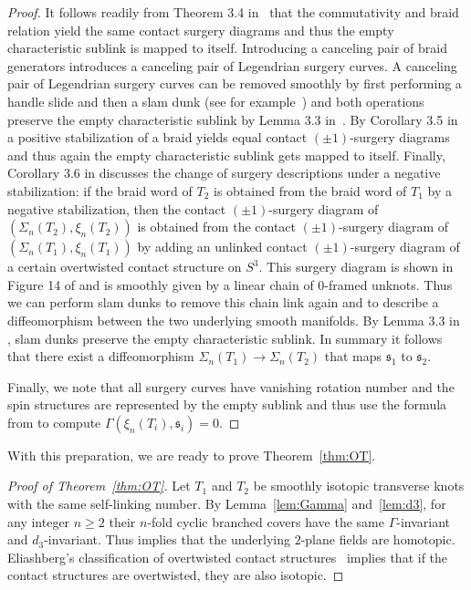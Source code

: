 \documentclass[11pt]{amsart}
\theoremstyle{definition}
\theoremstyle{definition}
\theoremstyle{definition}
\theoremstyle{definition}
\begin{document}
\begin{proof}
    It follows readily from Theorem 3.4 in~\cite{Harvey_br_covers} that the commutativity and braid relation yield the same contact surgery diagrams and thus the empty characteristic sublink is mapped to itself. Introducing a canceling pair of braid generators introduces a canceling pair of Legendrian surgery curves. A canceling pair of Legendrian surgery curves can be removed smoothly by first performing a handle slide and then a slam dunk (see for example~\cite{Casals_Etnyre_Kegel,surgery_distance}) and both operations preserve the empty characteristic sublink by Lemma 3.3 in~\cite{surgery_distance}. By Corollary 3.5 in \cite{Harvey_br_covers} a positive stabilization of a braid yields equal contact $(\pm1)$-surgery diagrams and thus again the empty characteristic sublink gets mapped to itself. Finally, Corollary 3.6 in \cite{Harvey_br_covers} discusses the change of surgery descriptions under a negative stabilization: if the braid word of $T_2$ is obtained from the braid word of $T_1$ by a negative stabilization, then the contact $(\pm1)$-surgery diagram of $(\Sigma_n(T_2),\xi_n(T_2))$ is obtained from the contact $(\pm1)$-surgery diagram of $(\Sigma_n(T_1),\xi_n(T_1))$ by adding an unlinked contact $(\pm1)$-surgery 
    diagram of a certain overtwisted contact structure on $S^3$. This surgery diagram is shown in Figure 14 of \cite{Harvey_br_covers} and is smoothly given by a linear chain of $0$-framed unknots. Thus we can perform slam dunks to remove this chain link again and to describe a diffeomorphism between the two underlying smooth manifolds. By Lemma 3.3 in \cite{surgery_distance}, slam dunks preserve the empty characteristic sublink. In summary it follows that there exist a diffeomorphism $\Sigma_n(T_1)\rightarrow \Sigma_n(T_2)$ that maps $\mathfrak{s}_1$ to $\mathfrak{s}_2$.

    Finally, we note that all surgery curves have vanishing rotation number and the spin structures are represented by the empty sublink and thus use the formula from \cite{EKS_contact_surgery_numbers} to compute $\Gamma(\xi_n(T_i),\mathfrak{s}_i)=0$.
\end{proof}

With this preparation, we are ready to prove Theorem~\ref{thm:OT}.

\begin{proof}[Proof of Theorem~\ref{thm:OT}]
    Let $T_1$ and $T_2$ be smoothly isotopic transverse knots with the same self-linking number. By Lemma~\ref{lem:Gamma} and~\ref{lem:d3}, for any integer $n\geq2$ their $n$-fold cyclic branched covers have the same $\Gamma$-invariant and $d_3$-invariant. Thus \cite{Gompf_Stein} implies that the underlying $2$-plane fields are homotopic. Eliashberg's classification of overtwisted contact structures~\cite{Eliashberg_OT} implies that if the contact structures are overtwisted, they are also isotopic. 
\end{proof}
\end{document}
